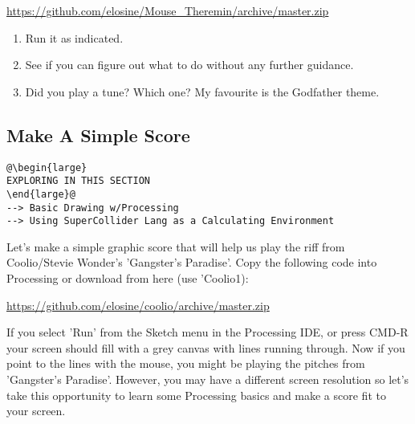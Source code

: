 \documentclass[twoside,a4paper]{refart}
\begin{document}
\textcolor{blue}{\url{https://github.com/elosine/Mouse_Theremin/archive/master.zip}}

\begin{enumerate}
	\item
Run it as indicated.  
	\item
See if you can figure out what to do without any further guidance.
	\item
Did you play a tune?
Which one?
My favourite is the Godfather theme.

\end{enumerate}
\begin{changemargin}{-1.5cm}{0.0cm} 

\end{changemargin}
\subsection{Make A Simple Score}
\begin{changemargin}{1.8cm}{0.0cm} 
\begin{lstlisting}[style=sumstyle2]
@\begin{large}
EXPLORING IN THIS SECTION
\end{large}@
--> Basic Drawing w/Processing
--> Using SuperCollider Lang as a Calculating Environment
\end{lstlisting} 
\end{changemargin}
Let's make a simple graphic score that will help us play the riff from Coolio/Stevie Wonder's 'Gangster's Paradise'.  Copy the following code into Processing or download from here (use 'Coolio1):

\textcolor{blue}{\url{https://github.com/elosine/coolio/archive/master.zip}}

\begin{changemargin}{-1.5cm}{0.0cm} 

\end{changemargin}

If you select 'Run' from the Sketch menu in the Processing IDE, or press CMD-R your screen should fill with a grey canvas with lines running through.  Now if you point to the lines with the mouse, you might be playing the pitches from 'Gangster's Paradise'.  However, you may have a different screen resolution so let's take this opportunity to learn some Processing basics and make a score fit to your screen.  
\end{document}
